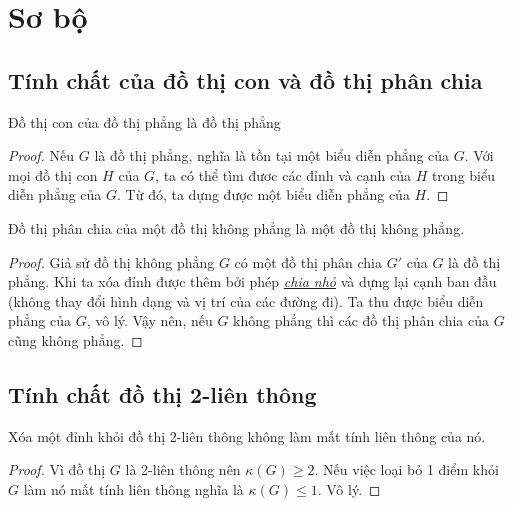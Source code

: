 \section{Sơ bộ}
\subsection{Tính chất của đồ thị con và đồ thị phân chia}

\begin{lemma}
    \label{lem:plnp}
    Đồ thị con của đồ thị phẳng là đồ thị phẳng
\end{lemma}

\begin{proof}
    Nếu $G$ là đồ thị phẳng, nghĩa là tồn tại một biểu diễn phẳng của $G$. Với mọi đồ thị con
    $H$ của $G$, ta có thể tìm đươc các đỉnh và cạnh của $H$ trong biểu diễn phẳng của $G$.
    Từ đó, ta dựng được một biểu diễn phẳng của $H$.
\end{proof}


\begin{lemma}
    \label{lem:subp}
    Đồ thị phân chia của một đồ thị không phẳng là một đồ thị không phẳng.
\end{lemma}
\begin{proof}
    Giả sử đồ thị không phẳng $G$ có một đồ thị phân chia $G'$ của $G$ là đồ thị phẳng.
    Khi ta xóa đỉnh được thêm bởi phép \hyperref[def:subdivision]{\textit{chia nhỏ}} và dựng lại cạnh ban đầu (không thay đổi hình dạng và vị trí của các đường đi). Ta thu được biểu diễn phẳng của $G$, vô lý.
    Vậy nên, nếu $G$ không phẳng thì các đồ thị phân chia của $G$ cũng không phẳng.
\end{proof}

\subsection{Tính chất đồ thị 2-liên thông}
\begin{corollary}
    Xóa một đỉnh khỏi đồ thị 2-liên thông không làm mất tính liên thông của nó.
\end{corollary}
\begin{proof}
    Vì đồ thị $G$ là 2-liên thông nên $\kappa(G) \geq 2$. Nếu việc loại bỏ 1 điểm khỏi $G$ làm nó mất tính liên thông nghĩa là $\kappa(G) \leq 1$. Vô lý.
\end{proof}

